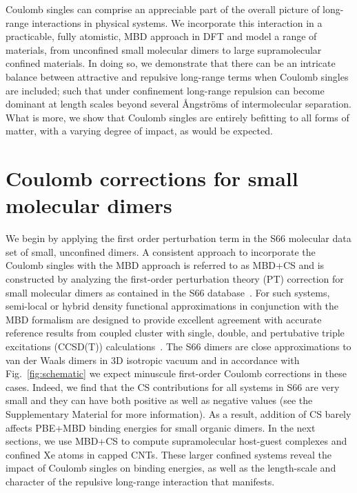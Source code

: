 \documentclass[aps,prl,groupaddress, twocolumn]{revtex4-1}
\begin{document}
Coulomb singles can comprise an appreciable part of the overall picture of long-range interactions in physical systems. We incorporate this interaction in a practicable, fully atomistic, MBD approach in DFT and model a range of materials, from unconfined small molecular dimers to large supramolecular confined materials. In doing so, we demonstrate that there can be an intricate balance between attractive and repulsive long-range terms when Coulomb singles are included; such that under confinement long-range repulsion can become dominant at length scales beyond several \r{A}ngstr\"{o}ms of intermolecular separation. What is more, we show that Coulomb singles are entirely befitting to all forms of matter, with a varying degree of impact, as would be expected. 

\section*{Coulomb corrections for small molecular dimers}
We begin by applying the first order perturbation term in the S66 molecular data set of small, unconfined dimers. A consistent approach to incorporate the Coulomb singles with the MBD approach is referred to as MBD+CS and is constructed by analyzing the first-order perturbation theory (PT) correction for small molecular dimers as contained in the S66 database~\cite{s66X8_database}.
For such systems, semi-local or hybrid density functional approximations in conjunction with the MBD formalism are designed to provide excellent agreement with accurate reference results from coupled cluster with single, double, and pertubative triple excitations (CCSD(T)) calculations~\cite{Tkatchenko2012}.
The S66 dimers are close approximations to van der Waals dimers in 3D isotropic vacuum and in accordance with Fig.~\ref{fig:schematic} we expect minuscule first-order Coulomb corrections in these cases.
Indeed, we find that the CS contributions for all systems in S66 are very small and they can have both positive as well as negative values (see the Supplementary Material for more information). As a result, addition of CS barely affects PBE+MBD binding energies for small organic dimers.
In the next sections, we use MBD+CS to compute supramolecular host-guest complexes and confined Xe atoms in capped CNTs. These larger confined systems reveal the impact of Coulomb singles on binding energies, as well as the length-scale and character of the repulsive long-range interaction that manifests. 
\end{document}
